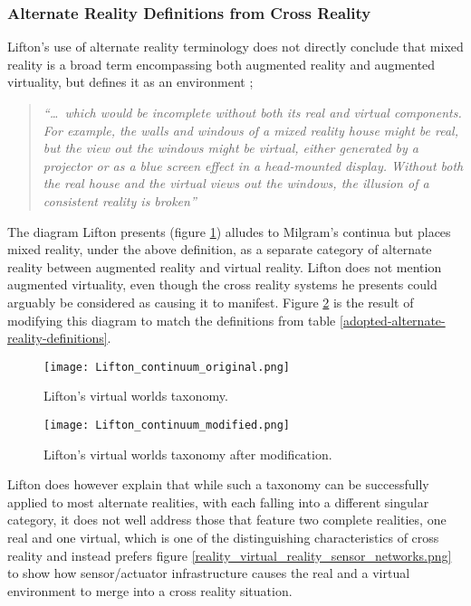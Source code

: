 
\subsubsection{Alternate Reality Definitions from Cross Reality}

Lifton's use of alternate reality terminology does not directly conclude that mixed reality is a broad term encompassing both augmented reality and augmented virtuality, but defines it as an environment ;

\begin{quote}
	\textit{``\ldots\ which would be incomplete without both its real and virtual components. For example, the walls and windows of a mixed reality house might be real, but the view out the windows might be virtual, either generated by a projector or as a blue screen effect in a head-mounted display. Without both the real house and the virtual views out the windows, the illusion of a consistent reality is broken''}~\cite{Lifton2007a}
\end{quote}

The diagram Lifton presents (figure \ref{original_lifton_axis.png}) alludes to Milgram's continua but places mixed reality, under the above definition, as a separate category of alternate reality between augmented reality and virtual reality. Lifton does not mention augmented virtuality, even though the cross reality systems he presents could arguably be considered as causing it to manifest. Figure \ref{modified_lifton_axis.png} is the result of modifying this diagram to match the definitions from table \ref{adopted-alternate-reality-definitions}.

\begin{figure}[h]
	\centering
	\texttt{[image: Lifton\_continuum\_original.png]}
	\caption{Lifton's virtual worlds taxonomy.}
	\label{original_lifton_axis.png}
\end{figure}

\begin{figure}[h]
	\centering
	\texttt{[image: Lifton\_continuum\_modified.png]}
	\caption{Lifton's virtual worlds taxonomy after modification.}
	\label{modified_lifton_axis.png}
\end{figure}

Lifton does however explain that while such a taxonomy can be successfully applied to most alternate realities, with each falling into a different singular category, it does not well address those that feature two complete realities, one real and one virtual, which is one of the distinguishing characteristics of cross reality and instead prefers figure \ref{reality_virtual_reality_sensor_networks.png} to show how sensor/actuator infrastructure causes the real and a virtual environment to merge into a cross reality situation.

